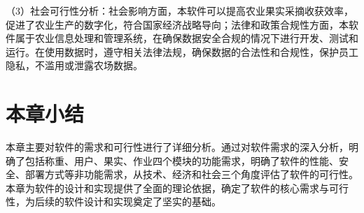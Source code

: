（3）社会可行性分析：社会影响方面，本软件可以提高农业果实采摘收获效率，促进了农业生产的数字化，符合国家经济战略导向\cite{Xu2020}；法律和政策合规性方面，本软件属于农业信息处理和管理系统，在确保数据安全合规的情况下进行开发、测试和运行。在使用数据时，遵守相关法律法规，确保数据的合法性和合规性，保护员工隐私，不滥用或泄露农场数据。

\section{本章小结}

本章主要对软件的需求和可行性进行了详细分析。通过对软件需求的深入分析，明确了包括称重、用户、果实、作业四个模块的功能需求，明确了软件的性能、安全、部署方式等非功能需求，从技术、经济和社会三个角度评估了软件的可行性。本章为软件的设计和实现提供了全面的理论依据，确定了软件的核心需求与可行性，为后续的软件设计和实现奠定了坚实的基础。

